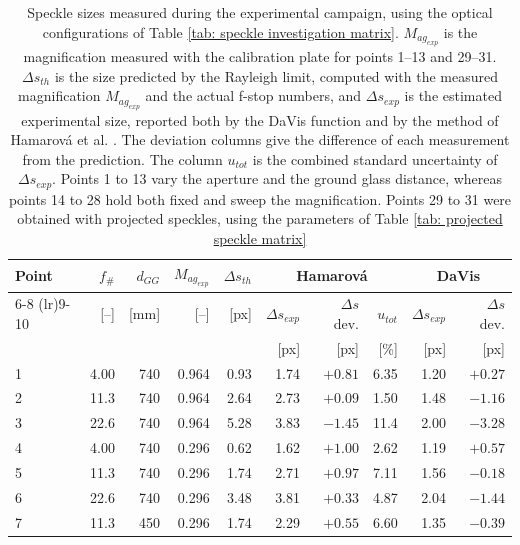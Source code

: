 \begin{table}[htbp]
    \centering
    \caption[Speckle sizes of the speckle pattern investigation]{Speckle sizes measured during the experimental campaign, using the optical configurations of Table \ref{tab: speckle investigation matrix}. $M_{ag_{exp}}$ is the magnification measured with the calibration plate for points 1--13 and 29--31. $\Delta s_{th}$ is the size predicted by the Rayleigh limit, computed with the measured magnification $M_{ag_{exp}}$ and the actual f-stop numbers, and $\Delta s_{exp}$ is the estimated experimental size, reported both by the DaVis function and by the method of Hamarová et al. \cite{Hamarova2016}. The deviation columns give the difference of each measurement from the prediction. The column $u_{tot}$ is the combined standard uncertainty of $\Delta s_{exp}$. Points 1 to 13 vary the aperture and the ground glass distance, whereas points 14 to 28 hold both fixed and sweep the magnification. Points 29 to 31 were obtained with projected speckles, using the parameters of Table \ref{tab: projected speckle matrix}}
    \label{tab: speckle results}
    \begin{tabular}{lrrrrrrrrr}
        \toprule
        Point & $f_\#$ & $d_{GG}$ & $M_{ag_{exp}}$ & $\Delta s_{th}$ & \multicolumn{3}{c}{Hamarová} & \multicolumn{2}{c}{DaVis} \\
        \cmidrule(lr){6-8} \cmidrule(lr){9-10}
              & [--] & [mm] & [--] & [px] & $\Delta s_{exp}$ & $\Delta s$ dev. & $u_{tot}$ & $\Delta s_{exp}$ & $\Delta s$ dev. \\
              &      &      &      &      & [px] & [px] & [\%] & [px] & [px] \\
        \midrule
          1 &  4.00 &  740 & 0.964 &  0.93 &  1.74 &   $+0.81$ &  6.35 &   1.20 &   $+0.27$ \\
          2 & 11.3 &  740 & 0.964 &  2.64 &  2.73 &   $+0.09$ &  1.50 &   1.48 &   $-1.16$ \\
          3 & 22.6 &  740 & 0.964 &  5.28 &  3.83 &   $-1.45$ & 11.4 &   2.00 &   $-3.28$ \\
          4 &  4.00 &  740 & 0.296 &  0.62 &  1.62 &   $+1.00$ &  2.62 &   1.19 &   $+0.57$ \\
          5 & 11.3 &  740 & 0.296 &  1.74 &  2.71 &   $+0.97$ &  7.11 &   1.56 &   $-0.18$ \\
          6 & 22.6 &  740 & 0.296 &  3.48 &  3.81 &   $+0.33$ &  4.87 &   2.04 &   $-1.44$ \\
          7 & 11.3 &  450 & 0.296 &  1.74 &  2.29 &   $+0.55$ &  6.60 &   1.35 &   $-0.39$ \\

\end{tabular}
\end{table}
